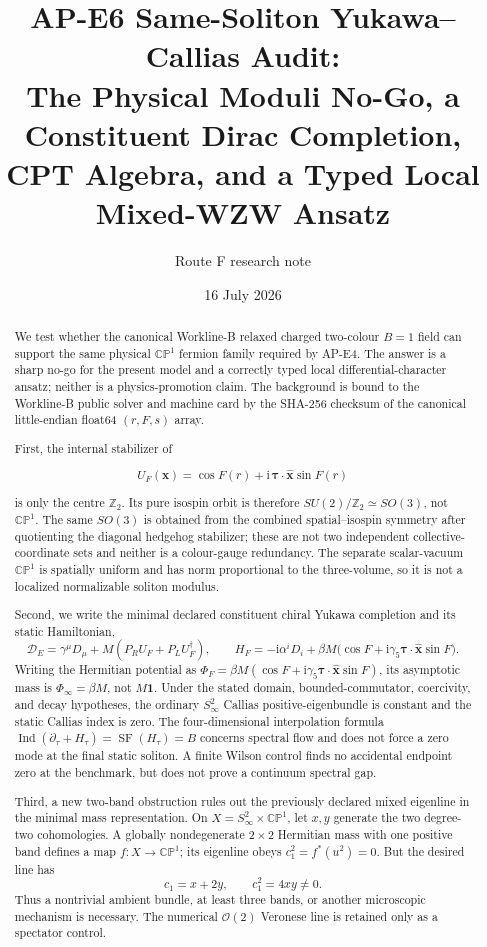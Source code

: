 \documentclass[11pt]{article}
\title{AP-E6 Same-Soliton Yukawa--Callias Audit:\\
The Physical Moduli No-Go, a Constituent Dirac Completion,\\
CPT Algebra, and a Typed Local Mixed-WZW Ansatz}
\author{Route F research note}
\date{16 July 2026}
\theoremstyle{definition}
\theoremstyle{remark}
\newcommand{\ii}{\mathrm i}
\newcommand{\ZZ}{\mathbb Z}
\newcommand{\CP}{\mathbb {CP}}
\newcommand{\cO}{\mathcal O}
\newcommand{\Ind}{\operatorname{Ind}}
\newcommand{\SF}{\operatorname{SF}}
\begin{document}
\maketitle

\begin{abstract}
We test whether the canonical Workline-B relaxed charged two-colour \(B=1\)
field can
support the same physical \(\CP^1\) fermion family required by AP-E4.  The
answer is a sharp no-go for the present model and a correctly typed local
differential-character ansatz; neither is a physics-promotion claim.  The
background is bound to the Workline-B public solver and machine card by the
SHA-256 checksum of the canonical little-endian float64 \((r,F,s)\) array.

First, the internal stabilizer of

\[
 U_F(\bm x)=\cos F(r)+\ii\,\bm\tau\!\cdot\!\widehat{\bm x}\sin F(r)
\]

is only the centre \(\ZZ_2\).  Its pure isospin orbit is therefore
\(SU(2)/\ZZ_2\simeq SO(3)\), not \(\CP^1\).  The same \(SO(3)\) is obtained
from the combined spatial--isospin symmetry after quotienting the diagonal
hedgehog stabilizer; these are not two independent collective-coordinate
sets and neither is a colour-gauge redundancy.  The separate scalar-vacuum
\(\CP^1\) is spatially uniform and has norm proportional to the three-volume,
so it is not a localized normalizable soliton modulus.

Second, we write the minimal declared constituent chiral Yukawa completion
and its static Hamiltonian,
\[
 \mathcal D_E=\gamma^\mu D_\mu
 +M(P_RU_F+P_LU_F^\dagger),\qquad
 H_F=-\ii\alpha^iD_i+\beta M
 \bigl(\cos F+\ii\gamma_5\bm\tau\!\cdot\!\widehat{\bm x}\sin F\bigr).
\]
Writing the Hermitian potential as
\(\Phi_F=\beta M(\cos F+\ii\gamma_5\bm\tau\cdot\widehat{\bm x}\sin F)\),
its asymptotic mass is \(\Phi_\infty=\beta M\), not \(M\bm1\).  Under the
stated domain, bounded-commutator, coercivity, and decay hypotheses, the
ordinary \(S^2_\infty\) Callias positive-eigenbundle is constant and the
static Callias index is zero.  The
four-dimensional interpolation formula
\(\Ind(\partial_\tau+H_\tau)=\SF(H_\tau)=B\) concerns spectral flow and does
not force a zero mode at the final static soliton.  A finite Wilson control
finds no accidental endpoint zero at the benchmark, but does not prove a
continuum spectral gap.

Third, a new two-band obstruction rules out the previously declared mixed
eigenline in the minimal mass representation.  On
\(X=S^2_\infty\times\CP^1\), let \(x,y\) generate the two degree-two
cohomologies.  A globally nondegenerate \(2\times2\) Hermitian mass with one
positive band defines a map \(f:X\to\CP^1\); its eigenline obeys
\(c_1^2=f^*(u^2)=0\).  But the desired line has
\[
 c_1=x+2y,\qquad c_1^2=4xy\ne0.
\]
Thus a nontrivial ambient bundle, at least three bands, or another microscopic
mechanism is necessary.  The numerical \(\cO(2)\) Veronese line is retained
only as a spectator control.


\end{abstract}
\end{document}
